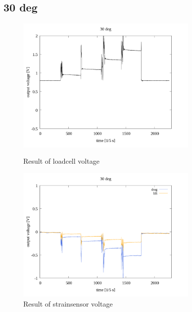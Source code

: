 \documentclass[twocolumn,a4j]{jsarticle}
\begin{document}
\subsection{30 deg}
\begin{figure}[htbp]
    \footnotesize
    \begin{center}
        \includegraphics[width=88mm]{../images/reverse/30_loadcell.png}
        \caption{Result of loadcell voltage}
        \includegraphics[width=88mm]{../images/reverse/30_strainsensor.png}
        \caption{Result of strainsensor voltage}
    \end{center}
\end{figure}

\newpage
\end{document}

